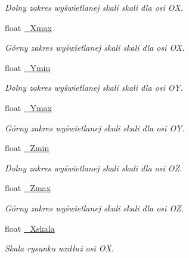 \begin{DoxyCompactItemize}
\begin{DoxyCompactList}\small\item\em Dolny zakres wyświetlanej skali skali dla osi {\itshape OX}. \end{DoxyCompactList}\item 
float \mbox{\hyperlink{class_pz_g_1_1_lacze_do_g_n_u_plota_a847e00678a413ab076ccbcb7eba3ae58}{\+\_\+\+Xmax}}
\begin{DoxyCompactList}\small\item\em Górny zakres wyświetlanej skali skali dla osi {\itshape OX}. \end{DoxyCompactList}\item 
float \mbox{\hyperlink{class_pz_g_1_1_lacze_do_g_n_u_plota_abc555fd6b82b0d5c9efb4802b58dc317}{\+\_\+\+Ymin}}
\begin{DoxyCompactList}\small\item\em Dolny zakres wyświetlanej skali skali dla osi {\itshape OY}. \end{DoxyCompactList}\item 
float \mbox{\hyperlink{class_pz_g_1_1_lacze_do_g_n_u_plota_ad7dfd3fad82ea0720ec89eacc18410bf}{\+\_\+\+Ymax}}
\begin{DoxyCompactList}\small\item\em Górny zakres wyświetlanej skali skali dla osi {\itshape OY}. \end{DoxyCompactList}\item 
float \mbox{\hyperlink{class_pz_g_1_1_lacze_do_g_n_u_plota_a8f9797e881df35f4206cb7d8030e5edc}{\+\_\+\+Zmin}}
\begin{DoxyCompactList}\small\item\em Dolny zakres wyświetlanej skali skali dla osi {\itshape OZ}. \end{DoxyCompactList}\item 
float \mbox{\hyperlink{class_pz_g_1_1_lacze_do_g_n_u_plota_a26949eedd421832f0f206ce3c8f90694}{\+\_\+\+Zmax}}
\begin{DoxyCompactList}\small\item\em Górny zakres wyświetlanej skali skali dla osi {\itshape OZ}. \end{DoxyCompactList}\item 
float \mbox{\hyperlink{class_pz_g_1_1_lacze_do_g_n_u_plota_a2c9303c4dbb4c9f0ddc4f1fe02eb3f70}{\+\_\+\+Xskala}}
\begin{DoxyCompactList}\small\item\em Skala rysunku wzdłuż osi {\itshape OX}. \end{DoxyCompactList}\item 

\end{DoxyCompactItemize}
